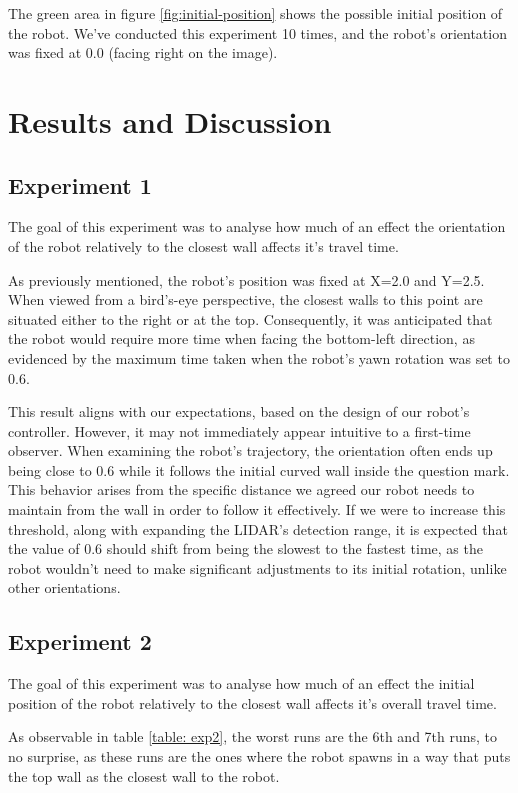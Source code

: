 \documentclass[conference]{IEEEtran}
\begin{document}
The green area in figure \ref{fig:initial-position} shows the possible initial position of the robot.
We've conducted this experiment 10 times, and the robot's orientation was fixed at 0.0 (facing right on the image).


\section{Results and Discussion}

\subsection{Experiment 1}

The goal of this experiment was to analyse how much of an effect the orientation of the robot relatively to the closest wall affects it's travel time.

As previously mentioned, the robot's position was fixed at X=2.0 and Y=2.5. When viewed from a bird's-eye perspective, the closest walls to this point are situated either to the right or at the top. Consequently, it was anticipated that the robot would require more time when facing the bottom-left direction, as evidenced by the maximum time taken when the robot's yawn rotation was set to 0.6.

This result aligns with our expectations, based on the design of our robot's controller. However, it may not immediately appear intuitive to a first-time observer. When examining the robot's trajectory, the orientation often ends up being close to 0.6 while it follows the initial curved wall inside the question mark. This behavior arises from the specific distance we agreed our robot needs to maintain from the wall in order to follow it effectively. If we were to increase this threshold, along with expanding the LIDAR's detection range, it is expected that the value of 0.6 should shift from being the slowest to the fastest time, as the robot wouldn't need to make significant adjustments to its initial rotation, unlike other orientations.

\subsection{Experiment 2}

The goal of this experiment was to analyse how much of an effect the initial position of the robot relatively to the closest wall affects it's overall travel time.

As observable in table \ref{table: exp2}, the worst runs are the 6th and 7th runs, to no surprise, as these runs are the ones where the robot spawns in a way that puts the top wall as the closest wall to the robot.
\end{document}
